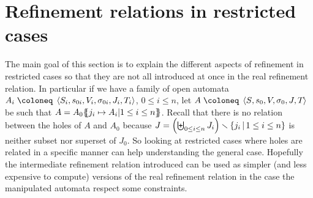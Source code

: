 \documentclass{article}
\begin{document}
\section{Refinement relations in restricted cases}\label{sec:prelref}
The main goal of this section is to explain the different aspects of refinement in restricted cases so that they are not all introduced at once in the real refinement relation.
In particular if we have a family of open automata \(A_i \defobject \OAg[i]\), \(0 \leq i \leq n\), let \(A \defobject \OAg\) be such that \(A = A_0{\left\{\!\!{\left\{j_i \mapsto A_i \middle| 1 \leq i \leq n\right\}}\!\!\right\}}\).
Recall that there is no relation between the holes of \(A\) and \(A_0\) because \(J = {\left(\biguplus_{0 \leq i \leq n} J_i\right)} \smallsetminus {\left\{j_i\,\middle|\,1 \leq i \leq n\right\}}\) is neither subset nor superset of \(J_0\).
So looking at restricted cases where holes are related in a specific manner can help understanding the general case.
Hopefully the intermediate refinement relation introduced can be used as simpler (and less expensive to compute) versions of the real refinement relation in the case the manipulated automata respect some constraints.
\end{document}
